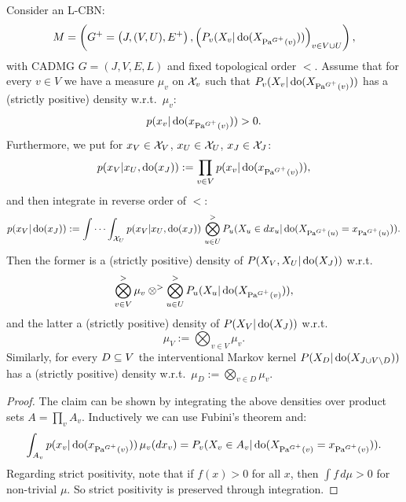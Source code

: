 \begin{Lem}
    \label{lem:cbn-str-pos-density}
    Consider an L-CBN:
        \[M= \left ( G^+=\left ( J,(V,U),E^+ \right ), \left ( P_v ( X_v|\operatorname{do}( X_{\mathrm{Pa}^{G^+}(v)})) \right )_{v \in V \cup U} \right ),\]
        with \observational CADMG $G=(J,V,E,L)$ and fixed topological order $<$.
    Assume that for every $v \in V$ we have a measure $\mu_v$ on $\mathcal{X}_v$ such that $P_v ( X_v|\operatorname{do}( X_{\mathrm{Pa}^{G^+}(v)}))$
    has a (strictly positive) density w.r.t.\ $\mu_v$:
    \[ p(x_v|\operatorname{do}(x_{\mathrm{Pa}^{G^+}(v)})) > 0. \]
    Furthermore, we put for $x_V \in \mathcal{X}_V$, $x_U \in \mathcal{X}_U$, $x_J \in \mathcal{X}_J$:
    \[ p(x_V|x_U,\operatorname{do}(x_J)) := \prod_{v \in V} p(x_v|\operatorname{do}(x_{\mathrm{Pa}^{G^+}(v)})),  \]
    and then integrate in reverse order of $<$:
    \[ p(x_V|\operatorname{do}(x_J)) := \idotsint_{\mathcal{X}_U} p(x_V|x_U,\operatorname{do}(x_J)) \, 
    \bigotimes_{ u \in U}^> P_u (X_u \in dx_u|\operatorname{do}( X_{\mathrm{Pa}^{G^+}(u)} = x_{\mathrm{Pa}^{G^+}(u)} )).   \]
    Then the former is a (strictly positive) density of $P(X_V,X_U|\operatorname{do}(X_J))$ w.r.t.\ 
    \[ \bigotimes_{ v \in V}^> \mu_v \otimes^> \bigotimes_{ u \in U}^> P_u (X_u|\operatorname{do}( X_{\mathrm{Pa}^{G^+}(v)} )), \]
    and the latter a (strictly positive) density of $P(X_V|\operatorname{do}(X_J))$ w.r.t.\ 
    \[ \mu_V := \bigotimes_{ v \in V} \mu_v. \]
    Similarly, for every $D \subseteq V$ the interventional Markov kernel $P(X_D|\operatorname{do}(X_{J \cup V \setminus D}))$ has
    a (strictly positive) density w.r.t.\ $\mu_D:=\bigotimes_{ v \in D} \mu_v$.
    \begin{proof}
    The claim can be shown by integrating the above densities over product sets $A = \prod_v A_v$.
    Inductively we can use Fubini's theorem and:
    \[ \int_{A_v} p(x_v|\operatorname{do}(x_{\mathrm{Pa}^{G^+}(v)}))\, \mu_v(dx_v) = P_v(X_v \in A_v|\operatorname{do}( X_{\mathrm{Pa}^{G^+}(v)}=x_{\mathrm{Pa}^{G^+}(v)})).\]
     Regarding strict positivity, note that if $f(x) > 0$ for all $x$, then $\int f\, d\mu >0$ for non-trivial $\mu$. 
        So strict positivity is preserved through integration.
    \end{proof}
\end{Lem}

